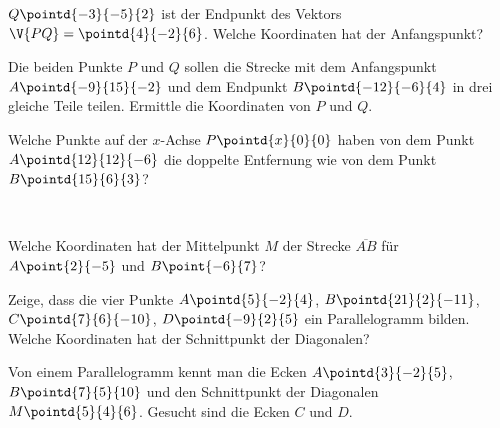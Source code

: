 \documentclass[%
11pt,%
twoside,%
titlepage,%
german,%
headsepline%
]{scrartcl}
\begin{document}
\begin{ueb}
$Q\pointd{-3}{-5}{2}$ ist der End\-punkt des Vektors $\V{PQ}=\pointd{4}{-2}{6}$. Welche Koordinaten hat der An\-fangs\-punkt?
\end{ueb}

\begin{ueb}[Drittle!]
Die beiden Punkte $P$ und $Q$ sollen die Strecke mit dem Anfangspunkt $A\pointd{- 9}{15}{- 2}$ und dem Endpunkt $B\pointd{- 12}{- 6}{4}$ in drei gleiche Teile teilen. Ermittle die Koordinaten von $P$ und $Q$.
\end{ueb}

\begin{ueb}[Distanz]
Welche Punkte auf der $x$-Achse $P\pointd{x}{0}{0}$ haben von dem Punkt $A\pointd{12}{12}{- 6}$ die doppelte Entfernung wie von dem Punkt $B\pointd{15}{6}{3}$?
\end{ueb}

\begin{ueb}
\ \\[-4ex]
\begin{enumeratea}
\item Welche Koordinaten hat der Mittelpunkt $M$ der Strecke $\overline{AB}$ für $A\point{2}{-5}$ und $B\point{-6}{7}$?
\item Zeige, dass die vier Punkte $A\pointd{5}{-2}{4}$, $B\pointd{21}{2}{-11}$, $C\pointd{7}{6}{-10}$, $D\pointd{-9}{2}{5}$ ein Pa\-ra\-llelo\-gramm bilden. Welche Koordinaten hat der Schnittpunkt der Diagonalen?
\end{enumeratea}
\end{ueb}

\begin{ueb}
Von einem Parallelogramm kennt man die Ecken $A\pointd{3}{-2}{5}$, $B\pointd{7}{5}{10}$ und den Schnittpunkt der Diagonalen $M\pointd{5}{4}{6}$. Gesucht sind die Ecken $C$ und $D$.
\end{ueb}
\end{document}
